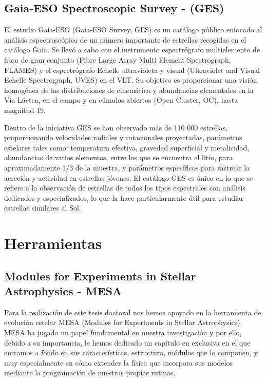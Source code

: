 \subsection{Gaia-ESO Spectroscopic Survey - (GES)}
El estudio Gaia-ESO (Gaia-ESO Survey, GES) \citep{Gilmore2012,Randich2013,Randich2022} es un catálogo público enfocado al análisis espectroscópico de un número importante de estrellas recogidas en el catálogo Gaia. Se llevó a cabo con el instrumento espectrógrafo multielemento de fibra de gran conjunto (Fibre Large Array Multi Element Spectrograph, FLAMES) y el espectrógrafo Echelle ultravioleta y visual (Ultraviolet and Visual Echelle Spectrograph, UVES) en el VLT. Su objetivo es proporcionar una visión homogénea de las distribuciones de cinemática y abundancias elementales en la Vía Láctea, en el campo y en cúmulos abiertos (Open Cluster, OC), hasta magnitud 19.\par 

Dentro de la iniciativa GES se han observado más de 110 000 estrellas, proporcionando velocidades radiales y rotacionales proyectadas, parámetros estelares tales como: temperatura efectiva, gravedad superficial y metalicidad, abundancias de varios elementos, entre los que se encuentra el litio, para aproximadamente 1/3 de la muestra, y parámetros específicos para rastrear la acreción y actividad en estrellas jóvenes. El catálogo GES es único en lo que se refiere a la observación de estrellas de todos los tipos espectrales con análisis dedicados y especializados, lo que la hace particularmente útil para estudiar estrellas similares al Sol.\par


\section{Herramientas}
\subsection{Modules for Experiments in Stellar Astrophysics - MESA}
Para la realización de este tesis doctoral nos hemos apoyado en la herramienta de evolución estelar MESA (Modules for Experiments in Stellar Astrophysics). MESA ha jugado un papel fundamental en nuestra investigación y por ello, debido a su importancia, le hemos dedicado un capítulo en exclusiva en el que entramos a fondo en sus características, estructura, módulos que lo componen, y muy especialmente en cómo extender la física que incorpora sus modelos mediante la programación de nuestras propias rutinas.\par


